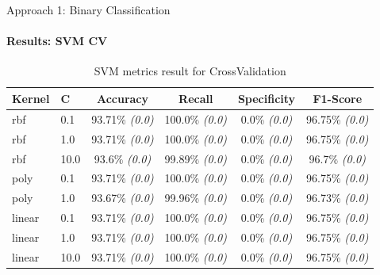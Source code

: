 \documentclass[9pt, pstricks, xcolor=dvipsnames]{beamer}
\begin{document}
\begin{frame}{Approach 1: Binary Classification}
	\framesubtitle{Results: SVM CV}
	\begin{table}[H]
		\centering
		\begin{tabular}{llcccc}
			\toprule
			Kernel & C    & Accuracy               & Recall                 & Specificity          & F1-Score               \\
			\midrule
			rbf    & 0.1  & 93.71\% \textit{(0.0)} & 100.0\% \textit{(0.0)} & 0.0\% \textit{(0.0)} & 96.75\% \textit{(0.0)} \\
			rbf    & 1.0  & 93.71\% \textit{(0.0)} & 100.0\% \textit{(0.0)} & 0.0\% \textit{(0.0)} & 96.75\% \textit{(0.0)} \\
			rbf    & 10.0 & 93.6\% \textit{(0.0)}  & 99.89\% \textit{(0.0)} & 0.0\% \textit{(0.0)} & 96.7\% \textit{(0.0)}  \\
			poly   & 0.1  & 93.71\% \textit{(0.0)} & 100.0\% \textit{(0.0)} & 0.0\% \textit{(0.0)} & 96.75\% \textit{(0.0)} \\
			poly   & 1.0  & 93.67\% \textit{(0.0)} & 99.96\% \textit{(0.0)} & 0.0\% \textit{(0.0)} & 96.73\% \textit{(0.0)} \\
			linear & 0.1  & 93.71\% \textit{(0.0)} & 100.0\% \textit{(0.0)} & 0.0\% \textit{(0.0)} & 96.75\% \textit{(0.0)} \\
			linear & 1.0  & 93.71\% \textit{(0.0)} & 100.0\% \textit{(0.0)} & 0.0\% \textit{(0.0)} & 96.75\% \textit{(0.0)} \\
			linear & 10.0 & 93.71\% \textit{(0.0)} & 100.0\% \textit{(0.0)} & 0.0\% \textit{(0.0)} & 96.75\% \textit{(0.0)} \\
			\bottomrule
		\end{tabular}
		\caption{SVM metrics result for CrossValidation}
		\label{tab:SVM_CV_approach1}
	\end{table}
\end{frame}
\end{document}
